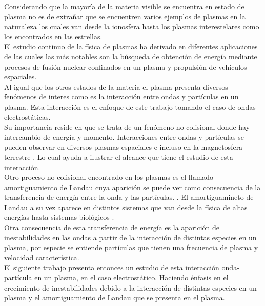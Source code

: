 \documentclass[../tesis_main_file.tex]{subfiles}
\begin{document}

Considerando que la mayoría de la materia visible se encuentra en estado de plasma \cite{bittencourt2013fundamentals} no es de extrañar que se encuentren varios ejemplos de plasmas en la naturaleza los cuales van desde la ionosfera hasta los plasmas interestelares como los encontrados en las estrellas.\\
El estudio continuo de la física de plasmas ha derivado en diferentes aplicaciones de las cuales las más notables son la búsqueda de obtención de energía mediante procesos de fusión nuclear confinados en un plasma y propulsión de vehículos espaciales.\\
Al igual que los otros estados de la materia el plasma presenta diversos fenómenos de interes como es la interacción entre ondas y partículas en un plasma. 
Esta interacción es el enfoque de este trabajo tomando el caso de ondas electrostáticas.\\
Su importancia reside en que se trata de un fenómeno no colisional donde hay intercambio de energía y momento. 
Interacciones entre ondas y partículas se pueden observar en diversos plasmas espaciales e incluso en la magnetosfera terrestre \cite{kitamura2018direct}.
Lo cual ayuda a ilustrar el alcance que tiene el estudio de esta interacción.\\
Otro proceso no colisional encontrado en los plasmas es el llamado amortiguamiento de Landau cuya aparición se puede ver como consecuencia de la transferencia de energía entre la onda y las partículas. \cite{bellan2008fundamentals}.
El amortiguamineto de Landau a su vez aparece en distintos sistemas que van desde la física de altas energías hasta sistemas biológicos \cite{sagan1994physics}.\\
Otra consecuencia de esta transferencia de energía es la aparición de inestabilidades en las ondas a partir de la interacción de distintas especies en un plasma, por especie se entiende partículas que tienen una frecuencia de plasma y velocidad característica.\\
El siguiente trabajo presenta entonces un estudio de esta interacción onda-partícula en un plasma, en el caso electrostático. Haciendo énfasis en el crecimiento de inestabilidades debido a la interacción de distintas especies en un plasma y el amortiguamiento de Landau que se presenta en el plasma.\\
\end{document}
